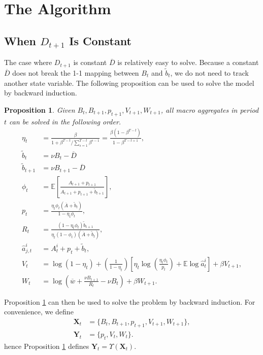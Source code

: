 \documentclass[twoside,11pt,leqno]{article}
\newcommand{\E}{\mathbb{E}}
\renewcommand{\vec}[1]{\ensuremath{\mathbf{#1}}}
\newtheorem{proposition}{Proposition}
\begin{document}
\section{The Algorithm}

\subsection{When $D_{t+1}$ Is Constant}

The case where $D_{t+1}$ is constant $\overline{D}$ is relatively easy to solve. Because a constant $\overline{D}$ does not break the 1-1 mapping between $B_t$ and $\tilde{b}_t$, we do not need to track another state variable. The following proposition can be used to solve the model by backward induction.
\begin{proposition}
\label{prop:algo_const}
Given $B_{t}, B_{t+1}, p_{t+1}, V_{t+1}, W_{t+1}$, all macro aggregates in period $t$ can be solved in the following order.
\begin{align*}
    \eta_t &= \frac{\beta}{1+\beta^{T-t}/\sum_{s=1}^{T-t}\beta^{s-1}} = \frac{\beta(1-\beta^{T-t})}{1-\beta^{T-t+1}}, \\
    \tilde{b}_{t} &= \nu B_t - \overline{D} \\
    \tilde{b}_{t+1} &= \nu B_{t+1} - \overline{D} \\
    \phi_{t} &= \E\left[\frac{A_{t+1}+p_{t+1}}{A_{t+1}+p_{t+1}+\tilde{b}_{t+1}} \right], \\
    p_{t} &= \frac{\eta_t \phi_{t}(\overline{A}+\tilde{b}_{t})}{1-\eta_t \phi_{t}}, \\
    R_{t} &= \frac{(1-\eta_t\phi_{t})\tilde{b}_{t+1}}{\eta_t(1-\phi_{t})(\overline{A}+\tilde{b}_{t})}, \\
    \hat{a}^i_{j,t} &= A^i_{t}+p_{t}+\tilde{b}_{t}, \\
    V_{t} &= \log(1-\eta_t) + \left(\frac{1}{1-\eta_t}\right)\left[\eta_t\log\left(\frac{\eta_t\phi_{t}}{p_{t}} \right)+\E\log \hat{a}^i_{t} \right]+\beta V_{t+1}, \\
    W_{t} &= \log\left(\overline{w}+\frac{\nu B_{t+1}}{R_{t}}-\nu B_{t} \right) + \beta W_{t+1}.
\end{align*}
\end{proposition}

Proposition \ref{prop:algo_const} can then be used to solve the problem by backward induction. For convenience, we define
\begin{align*}
    \vec{X}_t &= \{B_t, B_{t+1}, p_{t+1}, V_{t+1}, W_{t+1} \}, \\
    \vec{Y}_t &= \{ p_t, V_t, W_t \}.
\end{align*}
hence Proposition \ref{prop:algo_const} defines $\vec{Y}_t = \Upsilon(\vec{X}_t)$.
\end{document}
